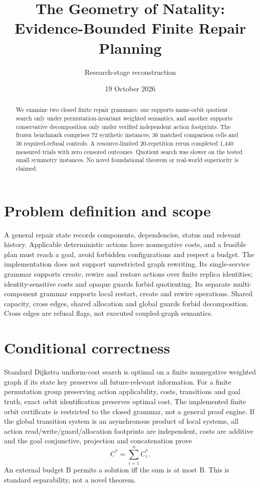 \documentclass[10pt,a4paper]{article}
\title{The Geometry of Natality: Evidence-Bounded Finite Repair Planning}
\author{Research-stage reconstruction}
\date{19 October 2026}
\begin{document}
\maketitle
\begin{abstract}
We examine two closed finite repair grammars: one supports name-orbit quotient search only under permutation-invariant weighted semantics, and another supports conservative decomposition only under verified independent action footprints. The frozen benchmark comprises 72 synthetic instances; 36 matched comparison cells and 36 required-refusal controls. A resource-limited 20-repetition rerun completed 1,440 measured trials with zero censored outcomes. Quotient search was slower on the tested small symmetry instances. No novel foundational theorem or real-world superiority is claimed.
\end{abstract}
\section{Problem definition and scope}
A general repair state records components, dependencies, status and relevant history. Applicable deterministic actions have nonnegative costs, and a feasible plan must reach a goal, avoid forbidden configurations and respect a budget. The implementation does not support unrestricted graph rewriting. Its single-service grammar supports create, rewire and restore actions over finite replica identities; identity-sensitive costs and opaque guards forbid quotienting. Its separate multi-component grammar supports local restart, create and rewire operations. Shared capacity, cross edges, shared allocation and global guards forbid decomposition. Cross edges are refusal flags, not executed coupled-graph semantics.
\section{Conditional correctness}
Standard Dijkstra uniform-cost search is optimal on a finite nonnegative weighted graph if its state key preserves all future-relevant information. For a finite permutation group preserving action applicability, costs, transitions and goal truth, exact orbit identification preserves optimal cost. The implemented finite orbit certificate is restricted to the closed grammar, not a general proof engine. If the global transition system is an asynchronous product of local systems, all action read/write/guard/allocation footprints are independent, costs are additive and the goal conjunctive, projection and concatenation prove
\[C^*=\sum_{i=1}^{n}C_i^*.\]
An external budget B permits a solution iff the sum is at most B. This is standard separability, not a novel theorem.
\end{document}
